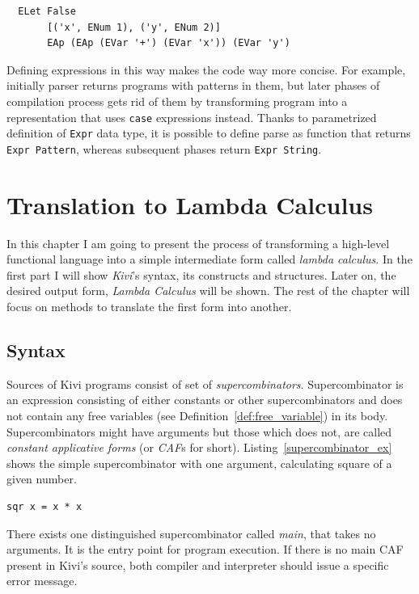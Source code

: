 \documentclass[12pt,a4paper]{report}
\begin{document}
\vspace*{0.2in}
\begin{lstlisting}
  ELet False
       [('x', ENum 1), ('y', ENum 2)]
       EAp (EAp (EVar '+') (EVar 'x')) (EVar 'y')
\end{lstlisting}

Defining expressions in this way makes the code way more concise. For example,
initially parser returns programs with patterns in them, but later phases of
compilation process gets rid of them by transforming program into a
representation that uses \texttt{case} expressions instead. Thanks to
parametrized definition of \texttt{Expr} data type, it is possible to define
parse as function that returns \texttt{Expr Pattern}, whereas subsequent phases
return \texttt{Expr String}.


\chapter{Translation to Lambda Calculus}

In this chapter I am going to present the process of transforming a high-level
functional language into a simple intermediate form called \textit{lambda calculus}.
In the first part I will show \textit{Kivi}'s syntax, its constructs and
structures. Later on, the desired output form, \textit{Lambda Calculus} will be
shown. The rest of the chapter will focus on methods to translate the first form
into another.

\section{Syntax}
Sources of Kivi programs consist of set of
\textit{supercombinators}\cite{wiki:supercombinator}. Supercombinator is an
expression consisting of either constants or other supercombinators and does
not contain any free variables (see Definition~\ref{def:free_variable}) in its
body. Supercombinators might have arguments but those which does not, are
called \textit{constant applicative forms} (or \textit{CAF}s for short).
Listing~\ref{supercombinator_ex} shows the simple supercombinator with one
argument, calculating square of a given number.

\vspace*{0.2in}
\begin{lstlisting}[style=haskell,label=supercombinator_ex,caption={Simple supercombinator.}]
sqr x = x * x
\end{lstlisting}

There exists one distinguished supercombinator called \textit{main}, that takes
no arguments. It is the entry point for program execution. If there is no main
CAF present in Kivi's source, both compiler and interpreter should issue a
specific error message.
\end{document}
